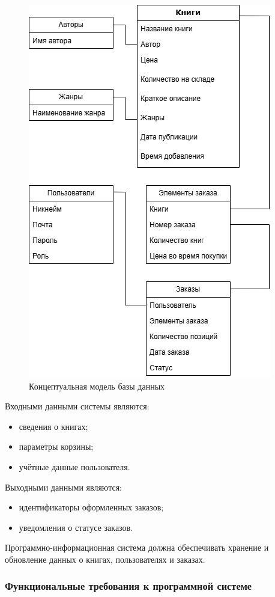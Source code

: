 \begin{figure}[H]
	\centering
	\includegraphics[width=0.7\linewidth]{"images/Модель_данных"}
	\caption{Концептуальная модель базы данных}
	\label{fig:--}
\end{figure}

Входными данными системы являются:
\begin{itemize}
	\item сведения о книгах;
	\item параметры корзины;
	\item учётные данные пользователя.
\end{itemize}

Выходными данными являются:
\begin{itemize}
	\item идентификаторы оформленных заказов;
	\item уведомления о статусе заказов.
\end{itemize}



Программно-информационная система должна обеспечивать хранение и обновление данных о книгах, пользователях и заказах.

\subsubsection{Функциональные требования к программной системе}

